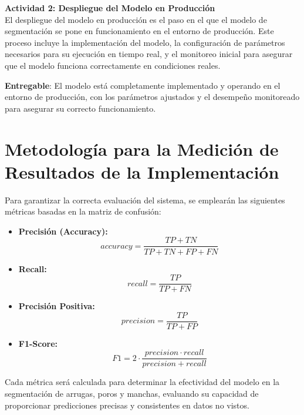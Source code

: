 \textbf{Actividad 2: Despliegue del Modelo en Producción}
\\
El despliegue del modelo en producción es el paso en el que el modelo de segmentación se pone en funcionamiento en el entorno de producción. Este proceso incluye la implementación del modelo, la configuración de parámetros necesarios para su ejecución en tiempo real, y el monitoreo inicial para asegurar que el modelo funciona correctamente en condiciones reales.

\textbf{Entregable}: El modelo está completamente implementado y operando en el entorno de producción, con los parámetros ajustados y el desempeño monitoreado para asegurar su correcto funcionamiento.

\section{Metodología para la Medición de Resultados de la Implementación}

Para garantizar la correcta evaluación del sistema, se emplearán las siguientes métricas basadas en la matriz de confusión:
\begin{itemize}
    \item \textbf{Precisión (Accuracy):} \[ accuracy = \frac{TP + TN}{TP + TN + FP + FN} \]
    \item \textbf{Recall:} \[ recall = \frac{TP}{TP + FN} \]
    \item \textbf{Precisión Positiva:} \[ precision = \frac{TP}{TP + FP} \]
    \item \textbf{F1-Score:} \[ F1 = 2 \cdot \frac{precision \cdot recall}{precision + recall} \]
\end{itemize}

Cada métrica será calculada para determinar la efectividad del modelo en la segmentación de arrugas, poros y manchas, evaluando su capacidad de proporcionar predicciones precisas y consistentes en datos no vistos.

